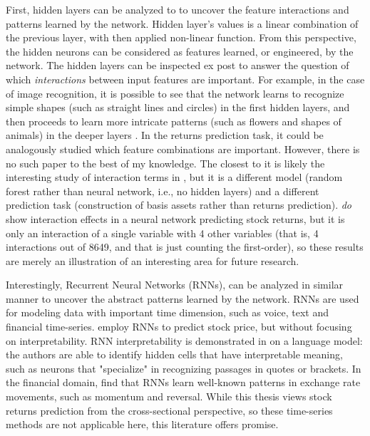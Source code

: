 			First, hidden layers can be analyzed to to uncover the feature interactions and patterns learned by the network. Hidden layer's values is a linear combination of the previous layer, with then applied non-linear function. From this perspective, the hidden neurons can be considered as features learned, or engineered, by the network. The hidden layers can be inspected ex post to answer the question of which \textit{interactions} between input features are important. For example, in the case of image recognition, it is possible to see that the network learns to recognize simple shapes (such as straight lines and circles) in the first hidden layers, and then proceeds to learn more intricate patterns (such as flowers and shapes of animals) in the deeper layers \citep{olah2017feature}. In the returns prediction task, it could be analogously studied which feature combinations are important. However, there is no such paper to the best of my knowledge. The closest to it is likely the interesting study of interaction terms in \cite{bryzgalova2019forest}, but it is a different model (random forest rather than neural network, i.e., no hidden layers) and a different prediction task (construction of basis assets rather than returns prediction). \cite{gu2020empirical} \textit{do} show interaction effects in a neural network predicting stock returns, but it is only an interaction of a single variable with 4 other variables (that is, 4 interactions out of 8649, and that is just counting the first-order), so these results are merely an illustration of an interesting area for future research. 
				
			Interestingly, Recurrent Neural Networks (RNNs), can be analyzed in similar manner to uncover the abstract patterns learned by the network. RNNs are used for modeling data with important time dimension, such as voice, text and financial time-series. \cite{di2016artificial} employ RNNs to predict stock price, but without focusing on interpretability. RNN interpretability is demonstrated in \cite{karpathy2015visualizing} on a language model: the authors are able to identify hidden cells that have interpretable meaning, such as neurons that "specialize" in recognizing passages in quotes or brackets. In the financial domain, \cite{giles1997rule} find that RNNs learn well-known patterns in exchange rate movements, such as momentum and reversal. While this thesis views stock returns prediction from the cross-sectional perspective, so these time-series methods are not applicable here, this literature offers promise.
			
